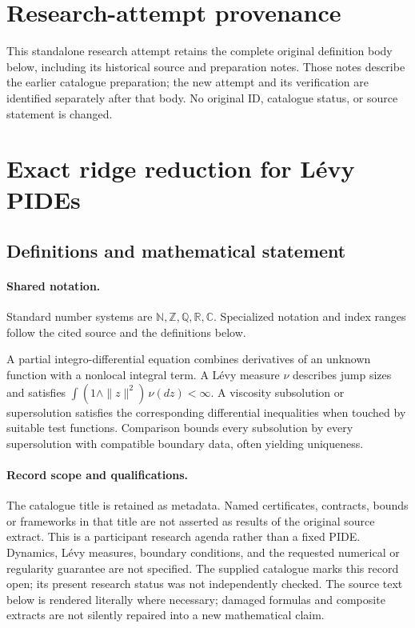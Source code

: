 \documentclass[11pt]{article}
\begin{document}
\section*{Research-attempt provenance}
This standalone research attempt retains the complete original definition body below,
including its historical source and preparation notes. Those notes describe the
earlier catalogue preparation; the new attempt and its verification are identified
separately after that body. No original ID, catalogue status, or source statement is changed.

\section{Exact ridge reduction for Lévy PIDEs}\label{statement}

\subsection{Definitions and mathematical statement}

\paragraph{Shared notation.}Standard number systems are $\mathbb N,\mathbb Z,\mathbb Q,\mathbb R,\mathbb C$. Specialized notation and index ranges follow the cited source and the definitions below.


A partial integro-differential equation combines derivatives of an unknown function with a nonlocal integral term. A Lévy measure $\nu$ describes jump sizes and satisfies $\int(1\wedge\|z\|^2)\,\nu(dz)<\infty$. A viscosity subsolution or supersolution satisfies the corresponding differential inequalities when touched by suitable test functions. Comparison bounds every subsolution by every supersolution with compatible boundary data, often yielding uniqueness.
\paragraph{Record scope and qualifications.}
The catalogue title is retained as metadata. Named certificates, contracts, bounds or frameworks in that title are not asserted as results of the original source extract.
This is a participant research agenda rather than a fixed PIDE. Dynamics, Lévy measures, boundary conditions, and the requested numerical or regularity guarantee are not specified. The supplied catalogue marks this record open; its present research status was not independently checked.
The source text below is rendered literally where necessary; damaged formulas and composite extracts are not silently repaired into a new mathematical claim.
\end{document}
